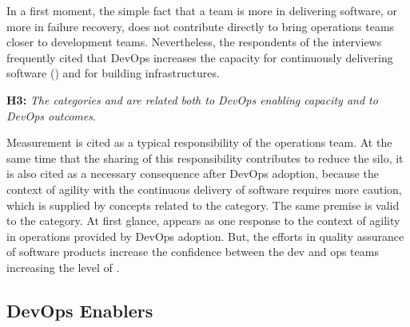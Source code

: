 In a first moment, the simple fact that a team is more
 in delivering software, or more  in failure recovery, does not
contribute directly to bring operations teams closer to development teams.
Nevertheless, the respondents of the interviews frequently cited that DevOps
increases the capacity for continuously delivering software ()
and for building  infrastructures.

\begin{mh}
\textbf{H3:} \textit{The categories  and 
are related both to DevOps enabling capacity and to DevOps outcomes}.
\end{mh}

Measurement is cited as a typical responsibility of the operations team.
At the same time that the sharing of this responsibility contributes to reduce the silo,
it is also cited as a necessary consequence after DevOps adoption, because
the context of agility with the continuous delivery of software requires more caution,
which is supplied by concepts related to the  category.
The same premise is valid to the  category. At first glance,
 appears as one response to the context of agility in operations
provided by DevOps adoption. But, the efforts in quality assurance of software products
increase the confidence between the dev and ops teams increasing the level
of .

\subsection{DevOps Enablers}

